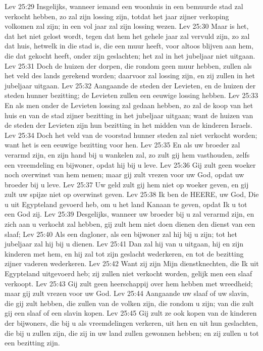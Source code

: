 Lev 25:29  Insgelijks, wanneer iemand een woonhuis in een bemuurde stad zal verkocht hebben, zo zal zijn lossing zijn, totdat het jaar zijner verkoping volkomen zal zijn; in een vol jaar zal zijn lossing wezen.
Lev 25:30  Maar is het, dat het niet gelost wordt, tegen dat hem het gehele jaar zal vervuld zijn, zo zal dat huis, hetwelk in die stad is, die een muur heeft, voor altoos blijven aan hem, die dat gekocht heeft, onder zijn geslachten; het zal in het jubeljaar niet uitgaan.
Lev 25:31  Doch de huizen der dorpen, die rondom geen muur hebben, zullen als het veld des lands gerekend worden; daarvoor zal lossing zijn, en zij zullen in het jubeljaar uitgaan.
Lev 25:32  Aangaande de steden der Levieten, en de huizen der steden hunner bezitting; de Levieten zullen een eeuwige lossing hebben.
Lev 25:33  En als men onder de Levieten lossing zal gedaan hebben, zo zal de koop van het huis en van de stad zijner bezitting in het jubeljaar uitgaan; want de huizen van de steden der Levieten zijn hun bezitting in het midden van de kinderen Israels.
Lev 25:34  Doch het veld van de voorstad hunner steden zal niet verkocht worden; want het is een eeuwige bezitting voor hen.
Lev 25:35  En als uw broeder zal verarmd zijn, en zijn hand bij u wankelen zal, zo zult gij hem vasthouden, zelfs een vreemdeling en bijwoner, opdat hij bij u leve.
Lev 25:36  Gij zult geen woeker noch overwinst van hem nemen; maar gij zult vrezen voor uw God, opdat uw broeder bij u leve.
Lev 25:37  Uw geld zult gij hem niet op woeker geven, en gij zult uw spijze niet op overwinst geven.
Lev 25:38  Ik ben de HEERE, uw God, Die u uit Egypteland gevoerd heb, om u het land Kanaan te geven, opdat Ik u tot een God zij.
Lev 25:39  Desgelijks, wanneer uw broeder bij u zal verarmd zijn, en zich aan u verkocht zal hebben, gij zult hem niet doen dienen den dienst van een slaaf;
Lev 25:40  Als een dagloner, als een bijwoner zal hij bij u zijn; tot het jubeljaar zal hij bij u dienen.
Lev 25:41  Dan zal hij van u uitgaan, hij en zijn kinderen met hem, en hij zal tot zijn geslacht wederkeren, en tot de bezitting zijner vaderen wederkeren.
Lev 25:42  Want zij zijn Mijn dienstknechten, die Ik uit Egypteland uitgevoerd heb; zij zullen niet verkocht worden, gelijk men een slaaf verkoopt.
Lev 25:43  Gij zult geen heerschappij over hem hebben met wreedheid; maar gij zult vrezen voor uw God.
Lev 25:44  Aangaande uw slaaf of uw slavin, die gij zult hebben, die zullen van de volken zijn, die rondom u zijn; van die zult gij een slaaf of een slavin kopen.
Lev 25:45  Gij zult ze ook kopen van de kinderen der bijwoners, die bij u als vreemdelingen verkeren, uit hen en uit hun geslachten, die bij u zullen zijn, die zij in uw land zullen gewonnen hebben; en zij zullen u tot een bezitting zijn.
